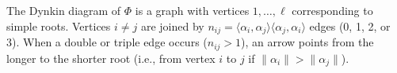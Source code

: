 The Dynkin diagram of $\Phi$ is a graph with vertices $1, \ldots, \ell$ corresponding to simple roots. Vertices $i \neq j$ are joined by $n_{ij} = \langle \alpha_i, \alpha_j \rangle \langle \alpha_j, \alpha_i \rangle$ edges (0, 1, 2, or 3). When a double or triple edge occurs ($n_{ij} > 1$), an arrow points from the longer to the shorter root (i.e., from vertex $i$ to $j$ if $\|\alpha_i\| > \|\alpha_j\|$).
